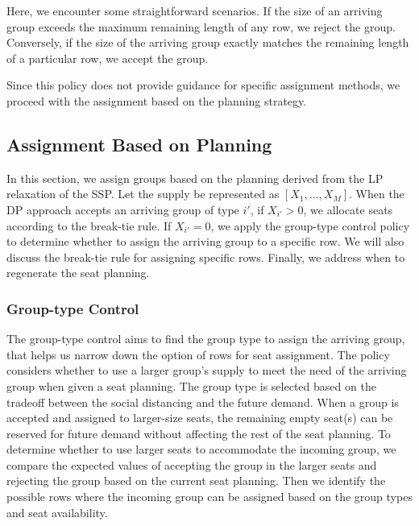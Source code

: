 Here, we encounter some straightforward scenarios. If the size of an arriving group exceeds the maximum remaining length of any row, we reject the group. Conversely, if the size of the arriving group exactly matches the remaining length of a particular row, we accept the group.

Since this policy does not provide guidance for specific assignment methods, we proceed with the assignment based on the planning strategy.


\subsection{Assignment Based on Planning}
In this section, we assign groups based on the planning derived from the LP relaxation of the SSP. Let the supply be represented as $[X_1, \ldots, X_M]$. When the DP approach accepts an arriving group of type $i{'}$, if $X_{i{'}} > 0$, we allocate seats according to the break-tie rule. If $X_{i{'}} = 0$, we apply the group-type control policy to determine whether to assign the arriving group to a specific row. We will also discuss the break-tie rule for assigning specific rows. Finally, we address when to regenerate the seat planning.



\subsubsection{Group-type Control}\label{nested_policy}
The group-type control aims to find the group type to assign the arriving group, that helps us narrow down the option of rows for seat assignment. The policy considers whether to use a larger group's supply to meet the need of the arriving group when given a seat planning. The group type is selected based on the tradeoff between the social distancing and the future demand. When a group is accepted and assigned to larger-size seats, the remaining empty seat(s) can be reserved for future demand without affecting the rest of the seat planning. To determine whether to use larger seats to accommodate the incoming group, we compare the expected values of accepting the group in the larger seats and rejecting the group based on the current seat planning. Then we identify the possible rows where the incoming group can be assigned based on the group types and seat availability.

